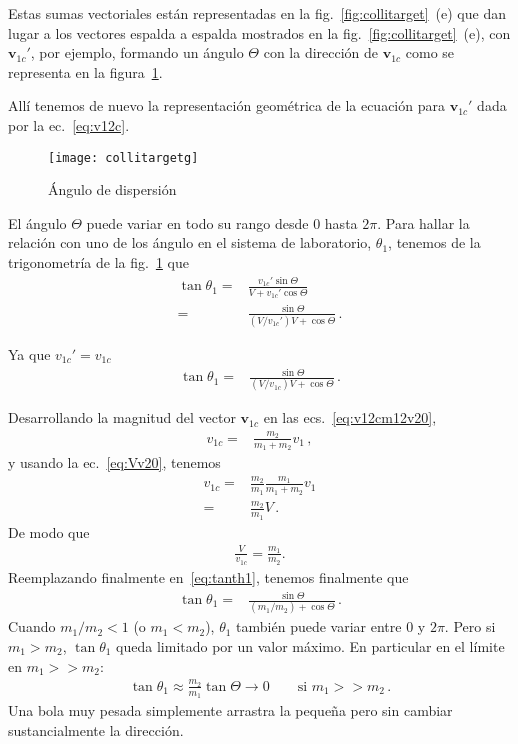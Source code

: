 Estas sumas vectoriales están representadas en la
fig.~\ref{fig:collitarget}~(e) que dan lugar a los vectores espalda a
espalda mostrados en la fig.~\ref{fig:collitarget}~(e), con
$\mathbf{v}_{1c}'$, por ejemplo, formando un ángulo $\Theta$ con la
dirección de $\mathbf{v}_{1c}$ como se representa en la figura~\ref{fig:collitargetg}. 

Allí tenemos de nuevo la representación geométrica de la ecuación para
$\mathbf{v}_{1c}'$ dada por la ec.~\eqref{eq:v12c}.

\begin{frame}
\begin{figure}
  \centering
  \texttt{[image: collitargetg]}
  \caption{Ángulo de dispersión}
  \label{fig:collitargetg}
\end{figure}
\end{frame}

El ángulo $\Theta$ puede variar en todo su rango desde $0$ hasta
$2\pi$. Para hallar la relación con uno de los ángulo en el sistema de
laboratorio, $\theta_1$, tenemos de la trigonometría de la
fig.~\ref{fig:collitargetg} que
\begin{align}
  \tan\theta_1=&\frac{v_{1c}'\sin\Theta}{V+v_{1c}'\cos\Theta}\nonumber\\
  =&\frac{\sin\Theta}{\left(V/v_{1c}'\right)V+\cos\Theta}\,.
\end{align}

Ya que $v_{1c}'=v_{1c}$
\begin{align}
  \label{eq:tanth1}
  \tan\theta_1=&\frac{\sin\Theta}{\left(V/v_{1c}\right)V+\cos\Theta}\,.
\end{align}

Desarrollando la magnitud del vector $\mathbf{v}_{1c}$ en las
ecs.~\eqref{eq:v12cm12v20}, 
\begin{align*}
 v_{1c}=&\frac{m_2}{m_1+m_2}v_1\,, 
 \end{align*}
y usando la ec.~\eqref{eq:Vv20}, tenemos
\begin{align*}
  v_{1c}=&\frac{m_2}{m_1}\frac{m_1}{m_1+m_2}v_1\nonumber\\
  =&\frac{m_2}{m_1}V\,.
\end{align*}
De modo que
\begin{align*}
  \frac{V}{v_{1c}}=\frac{m_1}{m_2}.
\end{align*}
Reemplazando finalmente en~\eqref{eq:tanth1}, tenemos finalmente que
\begin{align*}
    \tan\theta_1=&\frac{\sin\Theta}{\left(m_1/m_2\right)+\cos\Theta}\,.
\end{align*}
Cuando $m_1/m_2<1$ (o $m_1<m_2$), $\theta_1$ también puede variar entre $0$ y
$2\pi$. Pero si $m_1>m_2$, $\tan\theta_1$ queda limitado por un valor
máximo. En particular en el límite en $m_1>>m_2$:
\begin{align*}
  \tan\theta_1\approx \frac{m_2}{m_1}\tan\Theta\to 0\qquad\text{si $m_1>>m_2$}\,.
\end{align*}
Una bola muy pesada simplemente arrastra la pequeña pero sin cambiar
sustancialmente la dirección.




